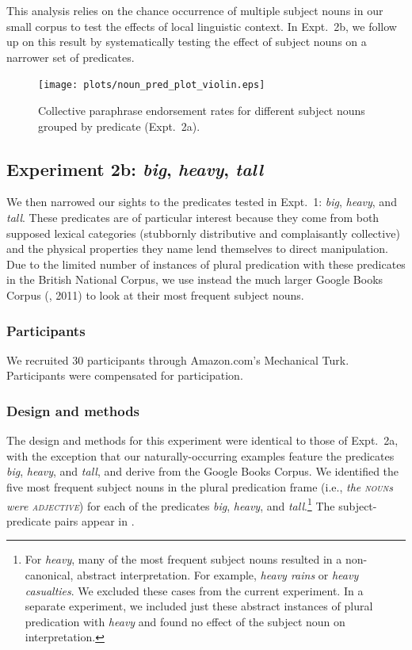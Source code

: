 \documentclass[preprint,12pt,authoryear,titlepage]{elsarticle}
\begin{document}
This analysis relies on the chance occurrence of multiple subject nouns in our small corpus to test the effects of local linguistic context. In Expt.~2b, we follow up on this result by systematically testing the effect of subject nouns on a narrower set of predicates.

\begin{figure}[h!]
	\centering
	\texttt{[image: plots/noun\_pred\_plot\_violin.eps]}
	\caption{Collective paraphrase endorsement rates for different subject nouns grouped by predicate (Expt.~2a).} \label{noun-pred-coll}
\end{figure}


\subsection{Experiment 2b: \emph{big}, \emph{heavy}, \emph{tall}}

We then narrowed our sights to the predicates tested in Expt.~1: \emph{big}, \emph{heavy}, and \emph{tall}. These predicates are of particular interest because they come from both supposed lexical categories (stubbornly distributive and complaisantly collective) and the physical properties they name lend themselves to direct manipulation.
Due to the limited number of instances of plural predication with these predicates in the British National Corpus, we use instead the much larger Google Books Corpus (\citeauthor{davies2011}, 2011) to look at their most frequent subject nouns.

\subsubsection{Participants}

We recruited 30 participants through Amazon.com's Mechanical Turk. Participants were compensated for participation.

\subsubsection{Design and methods}

The design and methods for this experiment were identical to those of Expt.~2a, with the exception that our naturally-occurring examples feature the predicates \emph{big}, \emph{heavy}, and \emph{tall}, and derive from the Google Books Corpus. We identified the five most frequent subject nouns in the plural predication frame (i.e., \emph{the \textsc{noun}s were \textsc{adjective}}) for each of the predicates \emph{big}, \emph{heavy}, and \emph{tall}.\footnote{For \emph{heavy}, many of the most frequent subject nouns resulted in a non-canonical, abstract interpretation. For example, \emph{heavy rains} or \emph{heavy casualties}. We excluded these cases from the current experiment. In a separate experiment, we included just these abstract instances of plural predication with \emph{heavy} and found no effect of the subject noun on interpretation.} The subject-predicate pairs appear in \Next.
\end{document}

